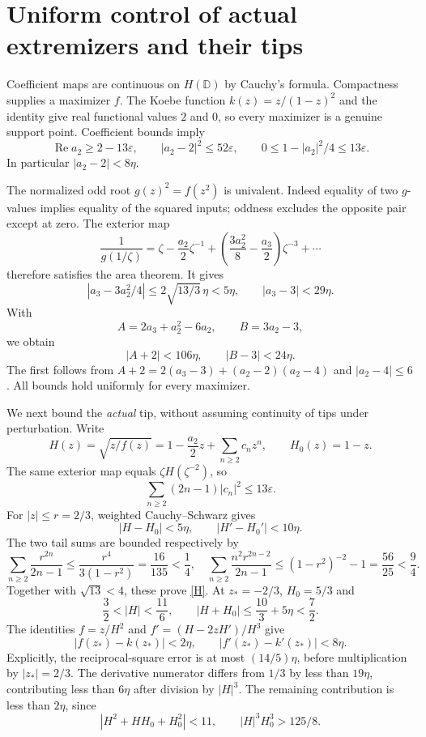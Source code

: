 \documentclass[10pt]{article}
\newcommand{\eps}{\varepsilon}
\newcommand{\D}{\mathbb D}
\newcommand{\Rea}{\operatorname{Re}}
\begin{document}
\section{Uniform control of actual extremizers and their tips}
Coefficient maps are continuous on \(H(\D)\) by Cauchy's formula.
Compactness supplies a maximizer \(f\). The Koebe function
\(k(z)=z/(1-z)^2\) and the identity give real functional values \(2\)
and \(0\), so every maximizer is a genuine support point.
Coefficient bounds imply
\begin{equation}\label{a2}
 \Rea a_2\ge2-13\eps,\qquad
 |a_2-2|^2\le52\eps,\qquad
 0\le1-|a_2|^2/4\le13\eps.
\end{equation}
In particular \(|a_2-2|<8\eta\).

The normalized odd root \(g(z)^2=f(z^2)\) is univalent.
Indeed equality of two \(g\)-values implies equality of the squared
inputs; oddness excludes the opposite pair except at zero.
The exterior map
\[
 \frac1{g(1/\zeta)}
 =\zeta-\frac{a_2}{2}\zeta^{-1}
       +\left(\frac{3a_2^2}{8}-\frac{a_3}{2}\right)\zeta^{-3}+\cdots
\]
therefore satisfies the area theorem. It gives
\[
 |a_3-3a_2^2/4|\le2\sqrt{13/3}\,\eta<5\eta,\qquad
 |a_3-3|<29\eta.
\]
With
\[
 A=2a_3+a_2^2-6a_2,\qquad B=3a_2-3,
\]
we obtain
\begin{equation}\label{AB}
             |A+2|<106\eta,\qquad |B-3|<24\eta.
\end{equation}
The first follows from
\(A+2=2(a_3-3)+(a_2-2)(a_2-4)\) and \(|a_2-4|\le6\).
All bounds hold uniformly for every maximizer.

We next bound the \emph{actual} tip, without assuming continuity of
tips under perturbation. Write
\[
 H(z)=\sqrt{z/f(z)}=1-\frac{a_2}{2}z+\sum_{n\ge2}c_nz^n,
 \qquad H_0(z)=1-z.
\]
The same exterior map equals \(\zeta H(\zeta^{-2})\), so
\[
                  \sum_{n\ge2}(2n-1)|c_n|^2\le13\eps.
\]
For \(|z|\le r=2/3\), weighted Cauchy--Schwarz gives
\begin{equation}\label{H}
                 |H-H_0|<5\eta,\qquad |H'-H_0'|<10\eta.
\end{equation}
The two tail sums are bounded respectively by
\[
 \sum_{n\ge2}\frac{r^{2n}}{2n-1}
 \le\frac{r^4}{3(1-r^2)}=\frac{16}{135}<\frac14,
 \quad
 \sum_{n\ge2}\frac{n^2r^{2n-2}}{2n-1}
 \le(1-r^2)^{-2}-1=\frac{56}{25}<\frac94 .
\]
Together with \(\sqrt{13}<4\), these prove \eqref{H}.
At \(z_*=-2/3\), \(H_0=5/3\) and
\[
 \frac32<|H|<\frac{11}{6},\qquad
 |H+H_0|\le\frac{10}{3}+5\eta<\frac72.
\]
The identities \(f=z/H^2\) and \(f'=(H-2zH')/H^3\) give
\begin{equation}\label{values}
             |f(z_*)-k(z_*)|<2\eta,\qquad
             |f'(z_*)-k'(z_*)|<8\eta .
\end{equation}
Explicitly, the reciprocal-square error is at most
\((14/5)\eta\), before multiplication by \(|z_*|=2/3\).
The derivative numerator differs from \(1/3\) by less than \(19\eta\),
contributing less than \(6\eta\) after division by \(|H|^3\).
The remaining contribution is less than \(2\eta\), since
\[
 |H^2+HH_0+H_0^2|<11,\qquad |H|^3H_0^3>125/8.
\]
\end{document}
